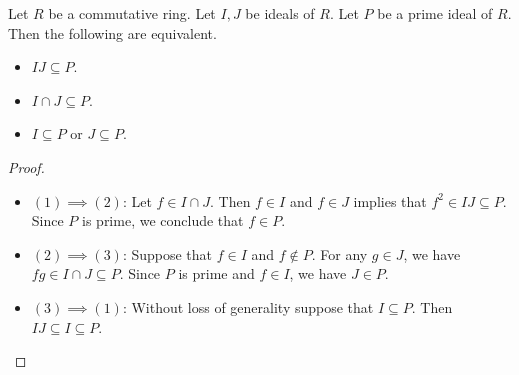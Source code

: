 \documentclass[a4paper]{article}
\begin{document}
\begin{lmm}{}{} Let $R$ be a commutative ring. Let $I,J$ be ideals of $R$. Let $P$ be a prime ideal of $R$. Then the following are equivalent. 
\begin{itemize}
\item $IJ\subseteq P$. 
\item $I\cap J\subseteq P$. 
\item $I\subseteq P$ or $J\subseteq P$. 
\end{itemize} 
\begin{proof}
\begin{itemize}
\item $(1)\implies(2)$: Let $f\in I\cap J$. Then $f\in I$ and $f\in J$ implies that $f^2\in IJ\subseteq P$. Since $P$ is prime, we conclude that $f\in P$. 
\item $(2)\implies(3)$: Suppose that $f\in I$ and $f\notin P$. For any $g\in J$, we have $fg\in I\cap J\subseteq P$. Since $P$ is prime and $f\in I$, we have $J\in P$. 
\item $(3)\implies(1)$: Without loss of generality suppose that $I\subseteq P$. Then $IJ\subseteq I\subseteq P$. 
\end{itemize}
\end{proof}
\end{lmm}
\end{document}

